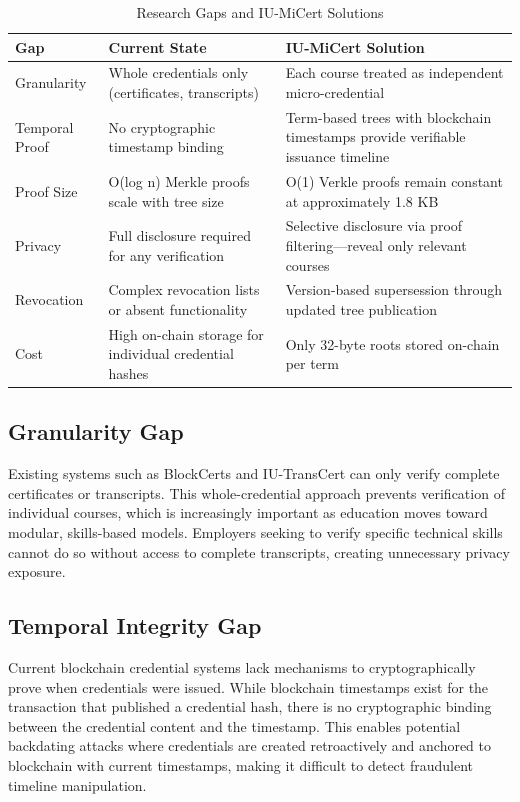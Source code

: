 \begin{table}[H]
\centering
\caption{Research Gaps and IU-MiCert Solutions}
\label{tab:research-gaps}
\begin{tabular}{|p{3cm}|p{4.5cm}|p{5.5cm}|}
\hline
\textbf{Gap} & \textbf{Current State} & \textbf{IU-MiCert Solution} \\
\hline
Granularity & Whole credentials only (certificates, transcripts) & Each course treated as independent micro-credential \\
\hline
Temporal Proof & No cryptographic timestamp binding & Term-based trees with blockchain timestamps provide verifiable issuance timeline \\
\hline
Proof Size & O(log n) Merkle proofs scale with tree size & O(1) Verkle proofs remain constant at approximately 1.8 KB \\
\hline
Privacy & Full disclosure required for any verification & Selective disclosure via proof filtering—reveal only relevant courses \\
\hline
Revocation & Complex revocation lists or absent functionality & Version-based supersession through updated tree publication \\
\hline
Cost & High on-chain storage for individual credential hashes & Only 32-byte roots stored on-chain per term \\
\hline
\end{tabular}
\end{table}

\subsection{Granularity Gap}
Existing systems such as BlockCerts and IU-TransCert can only verify complete certificates or transcripts. This whole-credential approach prevents verification of individual courses, which is increasingly important as education moves toward modular, skills-based models. Employers seeking to verify specific technical skills cannot do so without access to complete transcripts, creating unnecessary privacy exposure.

\subsection{Temporal Integrity Gap}
Current blockchain credential systems lack mechanisms to cryptographically prove when credentials were issued. While blockchain timestamps exist for the transaction that published a credential hash, there is no cryptographic binding between the credential content and the timestamp. This enables potential backdating attacks where credentials are created retroactively and anchored to blockchain with current timestamps, making it difficult to detect fraudulent timeline manipulation.

